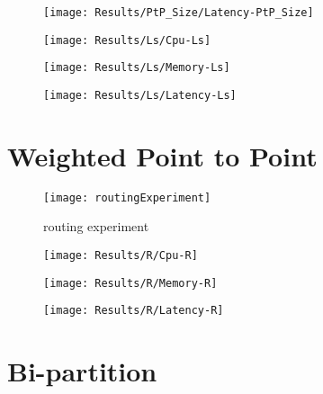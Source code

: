 \begin{figure}[htbp]
    \centering
    \texttt{[image: Results/PtP\_Size/Latency-PtP\_Size]}
    \label{fig:gantt}
\end{figure}

\begin{figure}[htbp]
    \centering
    \texttt{[image: Results/Ls/Cpu-Ls]}
    \label{fig:gantt}
\end{figure}

\begin{figure}[htbp]
    \centering
    \texttt{[image: Results/Ls/Memory-Ls]}
    \label{fig:gantt}
\end{figure}

\begin{figure}[htbp]
    \centering
    \texttt{[image: Results/Ls/Latency-Ls]}
    \label{fig:gantt}
\end{figure}

\newpage



\section{Weighted Point to Point} %
\label{sec:weighted point to point}

\begin{figure}[htbp]
    \centering
    \texttt{[image: routingExperiment]}
    \caption{routing experiment}
    \label{fig:gantt}
\end{figure}

\begin{figure}[htbp]
    \centering
    \texttt{[image: Results/R/Cpu-R]}
    \label{fig:gantt}
\end{figure}

\begin{figure}[htbp]
    \centering
    \texttt{[image: Results/R/Memory-R]}
    \label{fig:gantt}
\end{figure}

\begin{figure}[htbp]
    \centering
    \texttt{[image: Results/R/Latency-R]}
    \label{fig:gantt}
\end{figure}

\newpage



\section{Bi-partition} %
\label{sec:bi-partition}

